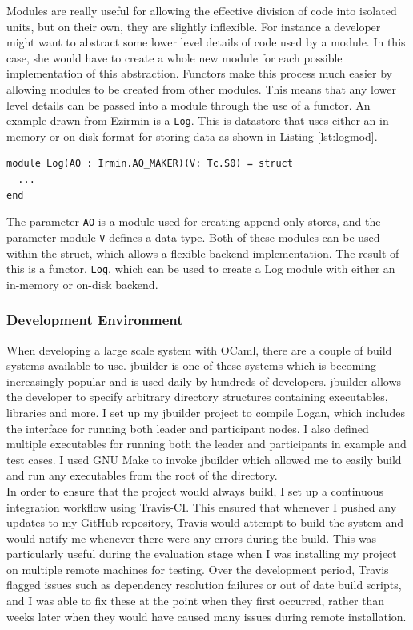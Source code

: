 \documentclass[12pt,a4paper,twoside,openright]{report}
\begin{document}
	Modules are really useful for allowing the effective division of code into isolated units, but on their own, they are slightly inflexible. 
	For instance a developer might want to abstract some lower level details of code used by a module.
	In this case, she would have to create a whole new module for each possible implementation of this abstraction.
	Functors make this process much easier by allowing modules to be created from other modules. 
	This means that any lower level details can be passed into a module through the use of a functor.
	An example drawn from Ezirmin is a \texttt{Log}. 
	This is datastore that uses either an in-memory or on-disk format for storing data as shown in Listing \ref{lst:logmod}.\\
	\begin{lstlisting}[caption={Ezirmin Log Module},label={lst:logmod},float,floatplacement=H]
module Log(AO : Irmin.AO_MAKER)(V: Tc.S0) = struct
  ...
end
	\end{lstlisting}
	\noindent The parameter \texttt{AO} is a module used for creating append only stores, and the parameter module \texttt{V} defines a data type.
	Both of these modules can be used within the struct, which allows a flexible backend implementation.
	The result of this is a functor, \texttt{Log}, which can be used to create a Log module with either an in-memory or on-disk backend.

	\subsubsection*{Development Environment}
	When developing a large scale system with OCaml, there are a couple of build systems available to use. 
	jbuilder \parencite{jbuilder} is one of these systems which is becoming increasingly popular and is used daily by hundreds of developers.
	jbuilder allows the developer to specify arbitrary directory structures containing executables, libraries and more.
	I set up my jbuilder project to compile Logan, which includes the interface for running both leader and participant nodes. 
	I also defined multiple executables for running both the leader and participants in example and test cases. 
	I used GNU Make \parencite{GNUMake} to invoke jbuilder which allowed me to easily build and run any executables from the root of the directory.\\
	
	In order to ensure that the project would always build, I set up a continuous integration workflow using Travis-CI. 
	This ensured that whenever I pushed any updates to my GitHub repository, Travis would attempt to build the system and would notify me whenever there were any errors during the build.
	This was particularly useful during the evaluation stage when I was installing my project on multiple remote machines for testing.
	Over the development period, Travis flagged issues such as dependency resolution failures or out of date build scripts, and I was able to fix these at the point when they first occurred, rather than weeks later when they would have caused many issues during remote installation.
\end{document}
